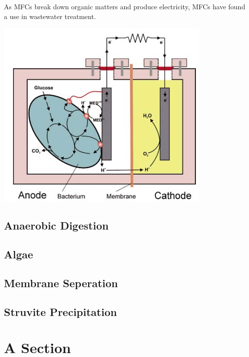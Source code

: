 \documentclass[10pt,a4paper,hidelinks]{article}
\begin{document}
As MFCs break down organic matters and produce electricity, MFCs have found a use in wastewater treatment.

	\includegraphics[scale=0.75]{gfx/mfc}
    \subsection{Anaerobic Digestion}
    \subsection{Algae}
    \subsection{Membrane Seperation}
    \subsection{Struvite Precipitation}
    \section{A Section}
    \lipsum[1]
    
    \nocite{*}
    
    
\end{document}
